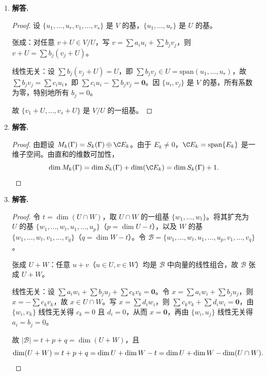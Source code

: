 \begin{enumerate}[label=\textbf{\arabic*.}, leftmargin=*, itemsep=1em]
\begin{proof}
映射 $\varphi:W\to V/U$，$w\mapsto w+U$ 是线性映射：$\varphi(c_1w_1+c_2w_2)=(c_1w_1+c_2w_2)+U=c_1(w_1+U)+c_2(w_2+U)$。由上述唯一性知 $\varphi$ 是单射；由 $V=U+W$ 知 $\varphi$ 是满射。故 $\varphi$ 是线性同构，$V/U\cong W$。
\end{proof}

\item \textbf{解答.}
\begin{proof}
设 $\{u_1,\dots,u_r,v_1,\dots,v_s\}$ 是 $V$ 的基，$\{u_1,\dots,u_r\}$ 是 $U$ 的基。

张成：对任意 $v+U\in V/U$，写 $v=\sum a_iu_i+\sum b_jv_j$，则 $v+U=\sum b_j(v_j+U)$。

线性无关：设 $\sum b_j(v_j+U)=U$，即 $\sum b_jv_j\in U=\mathrm{span}(u_1,\dots,u_r)$，故 $\sum b_jv_j=\sum c_iu_i$，即 $\sum c_iu_i-\sum b_jv_j=\mathbf{0}$。因 $\{u_i,v_j\}$ 是 $V$ 的基，所有系数为零，特别地所有 $b_j=0$。

故 $\{v_1+U,\dots,v_s+U\}$ 是 $V/U$ 的一组基。
\end{proof}

\item \textbf{解答.}
\begin{proof}
由题设 $M_k(\Gamma)=S_k(\Gamma)\oplus\C E_k$。由于 $E_k\ne 0$，$\C E_k=\mathrm{span}\{E_k\}$ 是一维子空间。由直和的维数可加性，
\[
\dim M_k(\Gamma)=\dim S_k(\Gamma)+\dim(\C E_k)=\dim S_k(\Gamma)+1. \qedhere
\]
\end{proof}

\item \textbf{解答.}
\begin{proof}
令 $t=\dim(U\cap W)$，取 $U\cap W$ 的一组基 $\{w_1,\dots,w_t\}$。将其扩充为 $U$ 的基 $\{w_1,\dots,w_t,u_1,\dots,u_p\}$（$p=\dim U-t$），以及 $W$ 的基 $\{w_1,\dots,w_t,v_1,\dots,v_q\}$（$q=\dim W-t$）。令 $\mathcal{B}=\{w_1,\dots,w_t,u_1,\dots,u_p,v_1,\dots,v_q\}$。

张成 $U+W$：任意 $u+v$（$u\in U,v\in W$）均是 $\mathcal{B}$ 中向量的线性组合，故 $\mathcal{B}$ 张成 $U+W$。

线性无关：设 $\sum a_iw_i+\sum b_ju_j+\sum c_kv_k=\mathbf{0}$。令 $x=\sum a_iw_i+\sum b_ju_j$，则 $x=-\sum c_kv_k$，故 $x\in U\cap W$。写 $x=\sum d_iw_i$，则 $\sum c_kv_k+\sum d_iw_i=\mathbf{0}$，由 $\{w_i,v_k\}$ 线性无关得 $c_k=0$ 且 $d_i=0$，从而 $x=\mathbf{0}$，再由 $\{w_i,u_j\}$ 线性无关得 $a_i=b_j=0$。

故 $|\mathcal{B}|=t+p+q=\dim(U+W)$，且
\[
\dim(U+W)=t+p+q=\dim U+\dim W-t=\dim U+\dim W-\dim(U\cap W). \qedhere
\]
\end{proof}


\end{enumerate}
